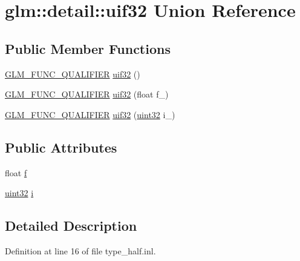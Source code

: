 \hypertarget{unionglm_1_1detail_1_1uif32}{}\section{glm\+::detail\+::uif32 Union Reference}
\label{unionglm_1_1detail_1_1uif32}
\subsection*{Public Member Functions}
\begin{DoxyCompactItemize}
\item 
\mbox{\hyperlink{setup_8hpp_a33fdea6f91c5f834105f7415e2a64407}{G\+L\+M\+\_\+\+F\+U\+N\+C\+\_\+\+Q\+U\+A\+L\+I\+F\+I\+ER}} \mbox{\hyperlink{unionglm_1_1detail_1_1uif32_a185c257ac32e21727191ba7e52d97e3e}{uif32}} ()
\item 
\mbox{\hyperlink{setup_8hpp_a33fdea6f91c5f834105f7415e2a64407}{G\+L\+M\+\_\+\+F\+U\+N\+C\+\_\+\+Q\+U\+A\+L\+I\+F\+I\+ER}} \mbox{\hyperlink{unionglm_1_1detail_1_1uif32_a0d6e08c93b3d52c01e45864ff689c426}{uif32}} (float f\+\_\+)
\item 
\mbox{\hyperlink{setup_8hpp_a33fdea6f91c5f834105f7415e2a64407}{G\+L\+M\+\_\+\+F\+U\+N\+C\+\_\+\+Q\+U\+A\+L\+I\+F\+I\+ER}} \mbox{\hyperlink{unionglm_1_1detail_1_1uif32_aee424b46f48baa812572c015ec8bf434}{uif32}} (\mbox{\hyperlink{namespaceglm_1_1detail_ade6cfbf377022aaa391af8cd50489222}{uint32}} i\+\_\+)
\end{DoxyCompactItemize}
\subsection*{Public Attributes}
\begin{DoxyCompactItemize}
\item 
float \mbox{\hyperlink{unionglm_1_1detail_1_1uif32_a5f697f84c5a8ec72c2f3a4f705f5bde8}{f}}
\item 
\mbox{\hyperlink{namespaceglm_1_1detail_ade6cfbf377022aaa391af8cd50489222}{uint32}} \mbox{\hyperlink{unionglm_1_1detail_1_1uif32_a981c1c59e160db23c73908cd7e629229}{i}}
\end{DoxyCompactItemize}


\subsection{Detailed Description}


Definition at line 16 of file type\+\_\+half.\+inl.



